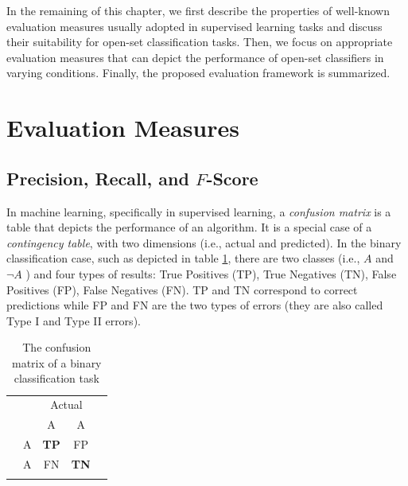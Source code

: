 In the remaining of this chapter, we first describe the properties of well-known evaluation measures usually adopted in supervised learning tasks and discuss their suitability for open-set classification tasks. Then, we focus on appropriate evaluation measures that can depict the performance of open-set classifiers in varying conditions. Finally, the proposed evaluation framework is summarized.

\section{Evaluation Measures}
\label{chap:eval_methods:sec:measures} 

\subsection{Precision, Recall, and $F$-Score}
\label{chap:eval_methods:sec:prf_micro}

In machine learning, specifically in supervised learning, a \textit{confusion matrix} is a table that depicts the performance of an algorithm. It is a special case of a \textit{contingency table}, with two dimensions (i.e., actual and predicted). In the binary classification case, such as depicted in table \ref{chap:eval_methods:tbl:bin_confusion}, there are two classes (i.e., $A$ and $\neg A$ ) and four types of results: True Positives (TP), True Negatives (TN), False Positives (FP), False Negatives (FN). TP and TN correspond to correct predictions while FP and FN are the two types of errors (they are also called Type I and Type II errors).

\begin{table}[t]
	\center
	\caption{The confusion matrix of a binary classification task}\label{chap:eval_methods:tbl:bin_confusion}
	\begin{tabular}{c c c c c}
		& & \multicolumn{2}{c}{Actual} & \\
		\cline{3-4}
		\multirow{3}{*}{\rotatebox[origin=r]{90}{Predicted}} & & \multicolumn{1}{|c}{A} & \multicolumn{1}{c|}{\neg A} &  \\
		\cline{2-4}
		& \multicolumn{1}{|c}{A} & \multicolumn{1}{|c}{\textbf{TP}} & \multicolumn{1}{c|}{FP} & \\
		& \multicolumn{1}{|c}{\neg A} & \multicolumn{1}{|c}{FN} &  \multicolumn{1}{c|}{\textbf{TN}} \\
		\cline{2-4}
		\\
	\end{tabular}
\end{table}

